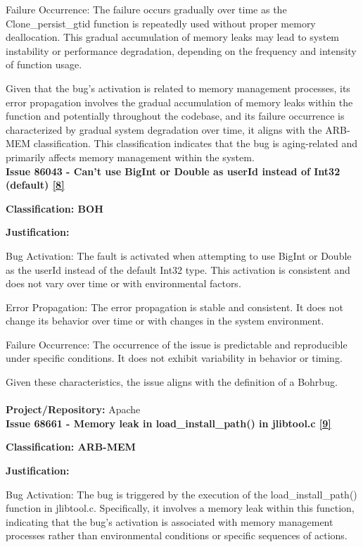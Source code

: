 \documentclass[12pt]{article}
\numberwithin{table}{section}
\begin{document}
	Failure Occurrence: The failure occurs gradually over time as the Clone\_persist\_gtid function is repeatedly used without proper memory deallocation. This gradual accumulation of memory leaks may lead to system instability or performance degradation, depending on the frequency and intensity of function usage.
	
	Given that the bug's activation is related to memory management processes, its error propagation involves the gradual accumulation of memory leaks within the function and potentially throughout the codebase, and its failure occurrence is characterized by gradual system degradation over time, it aligns with the ARB-MEM classification. This classification indicates that the bug is aging-related and primarily affects memory management within the system.\\
	
	\textbf{Issue 86043 - Can't use BigInt or Double as userId instead of Int32 (default) \href{https://bugs.mysql.com/bug.php?id=86043}{[8]}}
	
	\textbf{Classification: BOH}
	
	\textbf{Justification:}
	
	Bug Activation: The fault is activated when attempting to use BigInt or Double as the userId instead of the default Int32 type. This activation is consistent and does not vary over time or with environmental factors.
	
	Error Propagation: The error propagation is stable and consistent. It does not change its behavior over time or with changes in the system environment.
	
	Failure Occurrence: The occurrence of the issue is predictable and reproducible under specific conditions. It does not exhibit variability in behavior or timing.
	
	Given these characteristics, the issue aligns with the definition of a Bohrbug.\\
	\\
	\textbf{{\large Project/Repository: }} Apache\\
	
	\textbf{Issue 68661 - Memory leak in load\_install\_path() in jlibtool.c \href{https://bz.apache.org/bugzilla/show_bug.cgi?id=68661}{[9]}}
	
	\textbf{Classification: ARB-MEM}
	
	\textbf{Justification:}
	
	Bug Activation: The bug is triggered by the execution of the load\_install\_path() function in jlibtool.c. Specifically, it involves a memory leak within this function, indicating that the bug's activation is associated with memory management processes rather than environmental conditions or specific sequences of actions.
	
\end{document}
